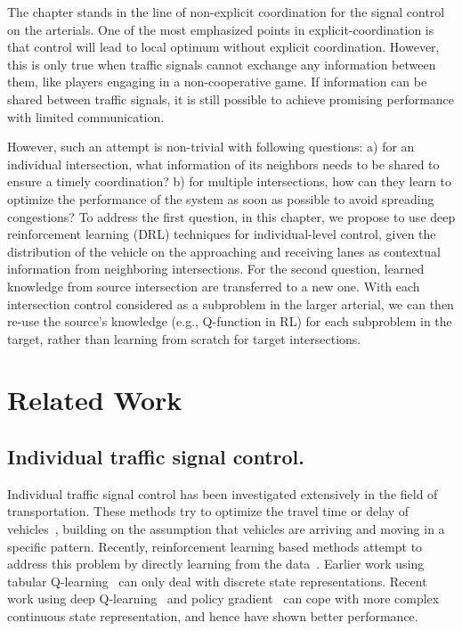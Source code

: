 {The chapter stands in the line of non-explicit coordination for the signal control on the arterials. One of the most emphasized points in explicit-coordination is that control will lead to local optimum without explicit coordination. However, this is only true when traffic signals cannot exchange any information between them, like players engaging in a non-cooperative game. If information can be shared between traffic signals, it is still possible to achieve promising performance with limited communication.

However, such an attempt is non-trivial with following questions: a) for an individual intersection, what information of its neighbors needs to be shared to ensure a timely coordination? b) for multiple intersections, how can they learn to optimize the performance of the system as soon as possible to avoid spreading congestions?
To address the first question, in this chapter, we propose to use deep reinforcement learning (DRL) techniques for individual-level control, given the distribution of the vehicle on the approaching and receiving lanes as contextual information from neighboring intersections.
For the second question, learned knowledge from source intersection are transferred to a new one. With each intersection control considered as a subproblem in the larger arterial, we can then re-use the source’s knowledge (e.g., Q-function in RL) for each subproblem in the target, rather than learning from scratch for target intersections.

}



\section{Related Work}
\subsection{Individual traffic signal control.}
Individual traffic signal control has been investigated extensively in the field of transportation. These methods try to optimize the travel time or delay of vehicles~\cite{Gart83,Henr84,Boil06,SeHe97}, building on the assumption that vehicles are arriving and moving in a specific pattern. Recently, reinforcement learning based methods attempt to address this problem by directly learning from the data~\cite{Wier00,MaDH16}. Earlier work using tabular Q-learning~\cite{APK03,ElAb10} can only deal with discrete state representations. Recent work using deep Q-learning~\cite{liLW16,VaOl16,wei2018intellilight} and policy gradient~\cite{MSCH17} can cope with more complex continuous state representation, and hence have shown better performance.

